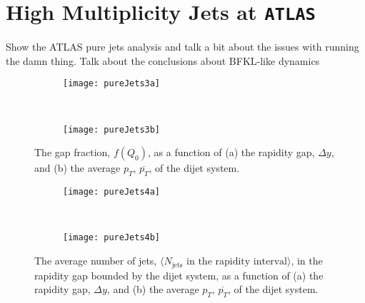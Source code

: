 
\chapter{High Multiplicity Jets at \texttt{ATLAS}}
\label{chap:ATLAS}

	Show the ATLAS pure jets analysis and talk a bit about the issues with running the damn thing.  Talk about the conclusions about BFKL-like dynamics

	\begin{figure}[H]
		\centering
		\begin{subfigure}[b]{0.48\textwidth}
			\texttt{[image: pureJets3a]}
			\caption{}
			\label{fig:}
		\end{subfigure}
		~
		\begin{subfigure}[b]{0.48\textwidth}
			\texttt{[image: pureJets3b]}
			\caption{}
			\label{fig:}
		\end{subfigure}
		\caption{The gap fraction, $f(Q_0)$, as a function of (a) the rapidity gap, $\Delta y$, and (b) the average $p_T$, $\overline{p_T}$, of the dijet system.}
		\label{fig:}

		\begin{subfigure}[b]{0.48\textwidth}
			\texttt{[image: pureJets4a]}
			\caption{}
			\label{fig:}
		\end{subfigure}
		~
		\begin{subfigure}[b]{0.48\textwidth}
			\texttt{[image: pureJets4b]}
			\caption{}
			\label{fig:}
		\end{subfigure}
		\caption{The average number of jets, $\langle N_{\text{jets}} \text{ in the rapidity interval}\rangle$, in the rapidity gap
		         bounded by the dijet system, as a function of (a) the rapidity gap, $\Delta y$, and (b) the average $p_T$, $\overline{p_T}$,
		         of the dijet system.}
		\label{fig:}
	\end{figure}

